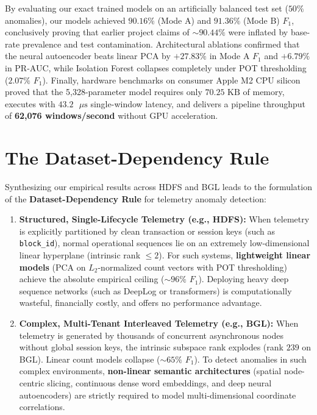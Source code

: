 By evaluating our exact trained models on an artificially balanced test set ($50\%$ anomalies), our models achieved $90.16\%$ (Mode A) and $91.36\%$ (Mode B) $F_1$, conclusively proving that earlier project claims of $\sim 90.44\%$ were inflated by base-rate prevalence and test contamination. Architectural ablations confirmed that the neural autoencoder beats linear PCA by $+27.83\%$ in Mode A $F_1$ and $+6.79\%$ in PR-AUC, while Isolation Forest collapses completely under POT thresholding ($2.07\%$ $F_1$). Finally, hardware benchmarks on consumer Apple M2 CPU silicon proved that the 5,328-parameter model requires only $70.25\text{ KB}$ of memory, executes with $43.2\text{ }\mu\text{s}$ single-window latency, and delivers a pipeline throughput of \textbf{62,076 windows/second} without GPU acceleration.

\section{The Dataset-Dependency Rule}
\label{sec:conclusion_rule}
Synthesizing our empirical results across HDFS and BGL leads to the formulation of the \textbf{Dataset-Dependency Rule} for telemetry anomaly detection:
\begin{enumerate}
    \item \textbf{Structured, Single-Lifecycle Telemetry (e.g., HDFS):} When telemetry is explicitly partitioned by clean transaction or session keys (such as \texttt{block\_id}), normal operational sequences lie on an extremely low-dimensional linear hyperplane (intrinsic rank $\le 2$). For such systems, \textbf{lightweight linear models} (PCA on $L_2$-normalized count vectors with POT thresholding) achieve the absolute empirical ceiling ($\sim 96\%$ $F_1$). Deploying heavy deep sequence networks (such as DeepLog or transformers) is computationally wasteful, financially costly, and offers no performance advantage.
    \item \textbf{Complex, Multi-Tenant Interleaved Telemetry (e.g., BGL):} When telemetry is generated by thousands of concurrent asynchronous nodes without global session keys, the intrinsic subspace rank explodes (rank $239$ on BGL). Linear count models collapse ($\sim 65\%$ $F_1$). To detect anomalies in such complex environments, \textbf{non-linear semantic architectures} (spatial node-centric slicing, continuous dense word embeddings, and deep neural autoencoders) are strictly required to model multi-dimensional coordinate correlations.
\end{enumerate}

